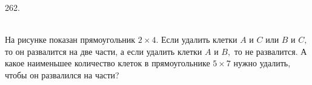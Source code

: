 262. \begin{figure}[ht!]
\end{figure}\\
На рисунке показан прямоугольник $2\times4.$ Если удалить клетки $A$ и $C$ или $B$ и $C,$ то он развалится на две части, а если удалить клетки $A$ и $B,$ то не развалится. А какое наименьшее количество клеток в прямоугольнике $5\times7$ нужно удалить, чтобы он развалился на части?\\
